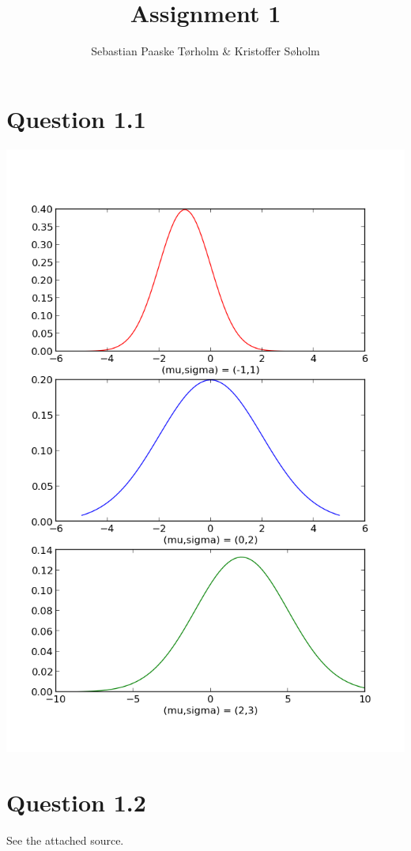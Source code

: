 \documentclass[11pt,a4paper]{article}
\title{Assignment 1}
\author{Sebastian Paaske Tørholm \& Kristoffer Søholm}
\begin{document}
\maketitle

\section{Question 1.1}
\includegraphics[scale=0.6]{figure_1.png}
\section{Question 1.2}
See the attached source.
\end{document}
